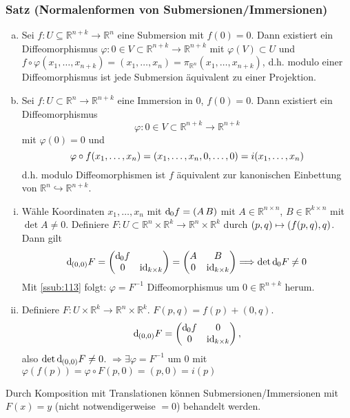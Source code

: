 \subsubsection{Satz (Normalenformen von Submersionen/Immersionen)} %
\label{ssub:15}
\begin{enumerate}[a)]
	\item Sei $f : U \subseteq \mathds{R}^{n+k} \to \mathds{R}^n$ eine Submersion mit $f(0)=0$. Dann existiert ein Diffeomorphismus 
	$\varphi : 0 \in V \subset \mathds{R}^{n+k} \to \mathds{R}^{n+k}$ mit $\varphi(V) \subset U$ und 
	$f \circ \varphi(x_1, \ldots , x_{n+k}) = (x_1, \ldots , x_n) = \pi_{\mathds{R}^n}(x_1, \ldots , x_{n+k})$, d.h. modulo einer Diffeomorphismus ist jede Submersion 
	äquivalent zu einer Projektion.
	\item Sei $f : U \subset \mathds{R}^n \to \mathds{R}^{n+k}$ eine Immersion in $0$, $f(0)=0$. Dann existiert ein Diffeomorphismus 
	\[
		\varphi : 0 \in V \subset \mathds{R}^{n+k} \to \mathds{R}^{n+k}
	\]
	mit $\varphi(0)=0$ und 
	\[
		\varphi \circ f (x_1, \ldots ,x _n) = \enbrace*{x_1, \ldots , x_n, 0 , \ldots , 0} = i(x_1, \ldots , x_n) 
	\]
	d.h. modulo Diffeomorphismen ist $f$ äquivalent zur kanonischen Einbettung von $\mathds{R}^n \hookrightarrow \mathds{R}^{n+k}$.
\end{enumerate}
\begin{enumerate}[(i)]
	\item Wähle Koordinaten $x_1, \ldots , x_n$ mit $\mathd_0 f = (A \, B)$ mit $A \in \mathds{R}^{n \times n}$, $B \in \mathds{R}^{k \times n}$ mit $\det A \not= 0$.
	Definiere $F : U \subset \mathds{R}^n \times \mathds{R}^k \to \mathds{R}^n \times \mathds{R}^k $ durch $(p,q) \mapsto \enbrace*{f(p,q), q}$. Dann gilt
	\[
		\mathd_{(0,0)} F = \begin{pmatrix}
			\mathd_0 f & \\
			0 & \id_{k \times k}
		\end{pmatrix} = \begin{pmatrix}
			A & B \\
			0 & \id_{k \times k} 
		\end{pmatrix}
		\Longrightarrow \det \mathd_0 F \not= 0
	\]
	Mit \ref{ssub:113} folgt: $\varphi = F ^{-1}$ Diffeomorphismus um $0 \in \mathds{R}^{n+k}$ herum.
	\item Definiere $F : U \times \mathds{R}^k \to \mathds{R}^n \times \mathds{R}^k$. $F(p,q) = f(p)+ (0,q)$.
	\[
		\mathd_{(0,0)} F = \begin{pmatrix}
			\mathd_0 f & 0 \\
			0 & \id_{k \times k}
		\end{pmatrix},
	\]
	also $\det \mathd_{(0,0)} F \not= 0$. $\Rightarrow  \exists \varphi = F ^{-1}$ um $0$ mit $\varphi(f(p))=\varphi \circ F (p,0) = (p,0) = i(p)$ \bewende
\end{enumerate}
Durch Komposition mit Translationen können Submersionen/Immersionen mit $F(x)=y$ (nicht notwendigerweise $=0$) behandelt werden.

